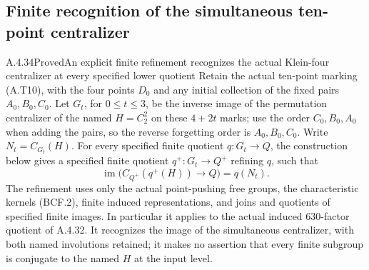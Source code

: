 \subsection{Finite recognition of the simultaneous ten-point centralizer}

\begin{result}{A.4.34}{Proved}{An explicit finite refinement recognizes the actual Klein-four centralizer at every specified lower quotient}
Retain the actual ten-point marking (A.T10), with the four
points $D_0$ and any initial collection of the fixed pairs
$A_0,B_0,C_0$.  Let $G_t$, for $0\leq t\leq3$, be the
inverse image of the permutation centralizer of the named
$H=C_2^2$ on these $4+2t$ marks; use the order
$C_0,B_0,A_0$ when adding the pairs, so the reverse
forgetting order is $A_0,B_0,C_0$.
Write $N_t=C_{G_t}(H)$.  For every specified finite quotient
$q:G_t\to Q$, the construction below gives a specified
finite quotient $q^+:G_t\to Q^+$ refining $q$, such that
\[
 \operatorname{im}\bigl(C_{Q^+}(q^+(H))\longrightarrow Q\bigr)
                              =q(N_t).                 \tag{HCF.1}
\]
The refinement uses only the actual point-pushing free groups,
the characteristic kernels (BCF.2), finite induced
representations, and joins and quotients of specified finite
images.  In particular it applies to the actual induced
$630$-factor quotient of A.4.32.  It recognizes the image of
the simultaneous centralizer, with both named involutions
retained; it makes no assertion that every finite subgroup
is conjugate to the named $H$ at the input level.
\end{result}

